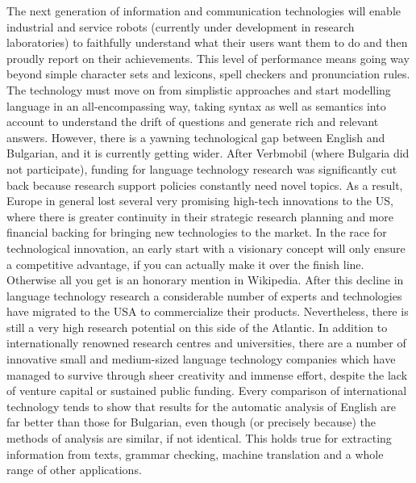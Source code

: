 \begin{multicols}{2}
The next generation of information and communication technologies will enable industrial and service robots (currently under development in research laboratories) to faithfully understand what their users want them to do and then proudly report on their achievements. This level of performance means going way beyond simple character sets and lexicons, spell checkers and pronunciation rules. The technology must move on from simplistic approaches and start modelling language in an all-encompassing way, taking syntax as well as semantics into account to understand the drift of questions and generate rich and relevant answers.
However, there is a yawning technological gap between English and Bulgarian, and it is currently getting wider. After Verbmobil (where Bulgaria did not participate), funding for language technology research was significantly cut back because research support policies constantly need novel topics. As a result, Europe in general lost several very promising high-tech innovations to the US, where there is greater continuity in their strategic research planning and more financial backing for bringing new technologies to the market. In the race for technological innovation, an early start with a visionary concept will only ensure a competitive advantage, if you can actually make it over the finish line. Otherwise all you get is an honorary mention in Wikipedia. 
After this decline in language technology research a considerable number of experts and technologies have migrated to the USA to commercialize their products. Nevertheless, there is still a very high research potential on this side of the Atlantic. In addition to internationally renowned research centres and universities, there are a number of innovative small and medium-sized language technology companies which have managed to survive through sheer creativity and immense effort, despite the lack of venture capital or sustained public funding. 
Every comparison of international technology tends to show that results for the automatic analysis of English are far better than those for Bulgarian, even though (or precisely because) the methods of analysis are similar, if not identical. This holds true for extracting information from texts, grammar checking, machine translation and a whole range of other applications. 


\end{multicols}
